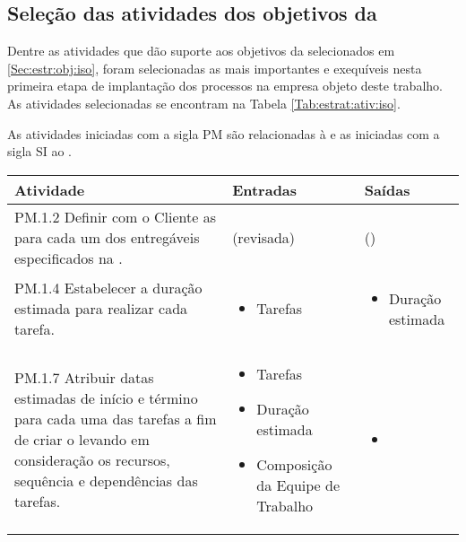 \subsection{Seleção das atividades dos objetivos da \iso}

Dentre as atividades que dão suporte aos objetivos da \iso \citep{iso} selecionados em \ref{Sec:estr:obj:iso}, foram selecionadas as mais importantes e exequíveis nesta primeira etapa de implantação dos processos na empresa objeto deste trabalho. As atividades selecionadas se encontram na Tabela \ref{Tab:estrat:ativ:iso}.

As atividades iniciadas com a sigla PM são relacionadas à \gp e as iniciadas com a sigla SI ao \dsw.

\begin{table}[h!]\footnotesize
\centering
\begin{tabular}
{
 	|p{7cm}
 	|p{}
 	|p{}|
}

\hline

	\textbf{Atividade \iso}&
	\textbf{Entradas}&
	\textbf{Saídas}\\
	\hline
	
	PM.1.2 Definir com o Cliente as \entrega para cada um dos entregáveis especificados na \dt.&
	\dt (revisada)&
	\ppj (\entrega)\\
	\hline
	
	PM.1.4 Estabelecer a duração estimada para realizar cada tarefa.&
	\ppj\par\begin{itemize}\item Tarefas\end{itemize}&
	\ppj\par\begin{itemize}\item Duração estimada\end{itemize}\\
	\hline
	
	PM.1.7 Atribuir datas estimadas de início e término para cada uma das tarefas a fim de criar o \crono levando em consideração os recursos, sequência e dependências das tarefas.&
	\ppj\par\begin{itemize}
		\item Tarefas
		\item Duração estimada
		\item Composição da Equipe de Trabalho
	\end{itemize}&
	\ppj\par\begin{itemize}
		\item \crono
	\end{itemize}\\
	\hline


\end{tabular}
\end{table}
